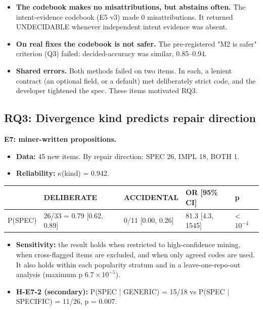 \documentclass[acmsmall,screen,review,anonymous]{acmart}
\begin{document}
\begin{itemize}
\item \textbf{The codebook makes no misattributions, but abstains often.} The intent-evidence codebook (E5 v3) made 0 misattributions. It returned UNDECIDABLE whenever independent intent evidence was absent.
\item \textbf{On real fixes the codebook is not safer.} The pre-registered "M2 is safer" criterion (Q3) failed: decided-accuracy was similar, 0.85--0.94.
\item \textbf{Shared errors.} Both methods failed on two items. In each, a lenient contract (an optional field, or a default) met deliberately strict code, and the developer tightened the spec. These items motivated RQ3.
\end{itemize}

\subsection{RQ3: Divergence kind predicts repair direction}

\textbf{E7: miner-written propositions.}
\begin{itemize}
\item \textbf{Data:} 45 new items. By repair direction: SPEC 26, IMPL 18, BOTH 1.
\item \textbf{Reliability:} $\kappa$(kind) = 0.942.
\end{itemize}

\begin{table}[t]
\small
\begin{tabularx}{\linewidth}{lXXXX}
\toprule
 & DELIBERATE & ACCIDENTAL & OR [95\% CI] & p \\
\midrule
P(SPEC) & 26/33 = 0.79 [0.62, 0.89] & 0/11 [0.00, 0.26] & 81.3 [4.3, 1545] & \textless{} $10^{-4}$ \\
\bottomrule
\end{tabularx}
\end{table}

\begin{itemize}
\item \textbf{Sensitivity:} the result holds when restricted to high-confidence mining, when cross-flagged items are excluded, and when only agreed codes are used. It also holds within each popularity stratum and in a leave-one-repo-out analysis (maximum p $6.7 \times 10^{-5}$).
\item \textbf{H-E7-2 (secondary):} P(SPEC | GENERIC) = 15/18 vs P(SPEC | SPECIFIC) = 11/26, p = 0.007.
\end{itemize}
\end{document}
